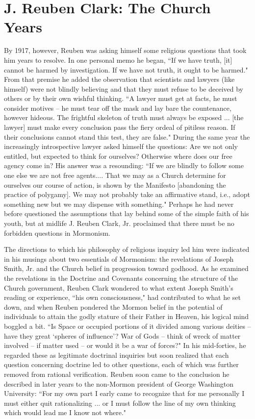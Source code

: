\chapter{J. Reuben Clark: The Church Years}

By 1917, however, Reuben was asking himself some religious questions that took 
him years to resolve. In one personal memo he began, ``If we have truth, [it] 
cannot be harmed by investigation. If we have not truth, it ought to be harmed." 
From that premise he added the observation that scientists and lawyers 
(like himself) were not blindly believing and that they must refuse to be 
deceived by others or by their own wishful thinking. ``A lawyer must get at 
facts, he must consider motives -- he must tear off the mask and lay bare the 
countenance, however hideous. The frightful skeleton of truth must always be 
exposed ... [the lawyer] must make every conclusion pass the fiery ordeal of 
pitiless reason. If their conclusions cannot stand this test, they are false." 
During the same year the increasingly introspective lawyer asked himself the 
questions: Are we not only entitled, but expected to think for ourselves? 
Otherwise where does our free agency come in? His answer was a resounding: 
``If we are blindly to follow some one else we are not free agents.... 
That we may as a Church determine for ourselves our course of action, is 
shown by the Manifesto [abandoning the practice of polygamy]. We may not 
probably take an affirmative stand, i.e., adopt something new but we may 
dispense with something." Perhaps he had never before questioned the assumptions 
that lay behind some of the simple faith of his youth, but at midlife J. 
Reuben Clark, Jr. proclaimed that there must be no forbidden questions in 
Mormonism.

The directions to which his philosophy of religious inquiry led him were 
indicated in his musings about two essentials of Mormonism: the revelations of 
Joseph Smith, Jr. and the Church belief in progression toward godhood. As he 
examined the revelations in the Doctrine and Covenants concerning the structure 
of the Church government, Reuben Clark wondered to what extent Joseph Smith's 
reading or experience, ``his own consciousness," had contributed to what he set 
down, and when Reuben pondered the Mormon belief in the potential of individuals 
to attain the godly stature of their Father in Heaven, his logical mind boggled 
a bit. ``Is Space or occupied portions of it divided among various deities -- 
have they great `spheres of influence'? War of Gods -- think of wreck of matter 
involved -- if matter used -- or would it be a war of forces?" In his 
mid-forties, he regarded these as legitimate doctrinal inquiries but soon 
realized that each question concerning doctrine led to other questions, each 
of which was further removed from rational verification. Reuben soon came to the 
conclusion he described in later years to the non-Mormon president of George 
Washington University: ``For my own part I early came to recognize that for me 
personally I must either quit rationalizing ... or I must follow the line of 
my own thinking which would lead me I know not where."


